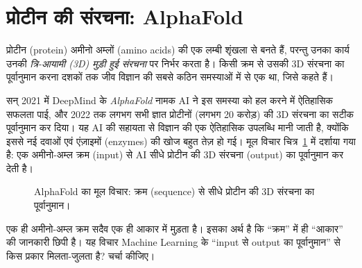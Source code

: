 \section{प्रोटीन की संरचना: AlphaFold}

प्रोटीन (protein) अमीनो अम्लों (amino acids) की एक लम्बी शृंखला से बनते हैं, परन्तु उनका
कार्य उनकी \emph{त्रि-आयामी (3D) मुड़ी हुई संरचना} पर निर्भर करता है। किसी क्रम से उसकी
3D संरचना का पूर्वानुमान करना दशकों तक जीव विज्ञान की सबसे कठिन समस्याओं में से एक था,
जिसे  कहते हैं।

सन् 2021 में DeepMind के \emph{AlphaFold} नामक AI ने इस समस्या को हल करने में ऐतिहासिक
सफलता पाई, और 2022 तक लगभग सभी ज्ञात प्रोटीनों (लगभग 20 करोड़) की 3D संरचना का सटीक
पूर्वानुमान कर दिया। यह AI की सहायता से विज्ञान की एक ऐतिहासिक उपलब्धि
मानी जाती है, क्योंकि इससे नई दवाओं एवं एंज़ाइमों (enzymes) की खोज बहुत तेज़ हो गई।
मूल विचार चित्र~\ref{fig:alphafold} में दर्शाया गया है: एक अमीनो-अम्ल क्रम (input) से
AI सीधे प्रोटीन की 3D संरचना (output) का पूर्वानुमान कर देती है।

\begin{figure}[h]
\centering
{}
\caption{AlphaFold का मूल विचार: क्रम (sequence) से सीधे प्रोटीन की 3D संरचना का
पूर्वानुमान।}
\label{fig:alphafold}
\end{figure}

\begin{sochiye}
एक ही अमीनो-अम्ल क्रम सदैव एक ही आकार में मुड़ता है। इसका अर्थ है कि “क्रम” में ही
“आकार” की जानकारी छिपी है। यह विचार Machine Learning के “input से output का
पूर्वानुमान” से किस प्रकार मिलता-जुलता है? चर्चा कीजिए।
\end{sochiye}

